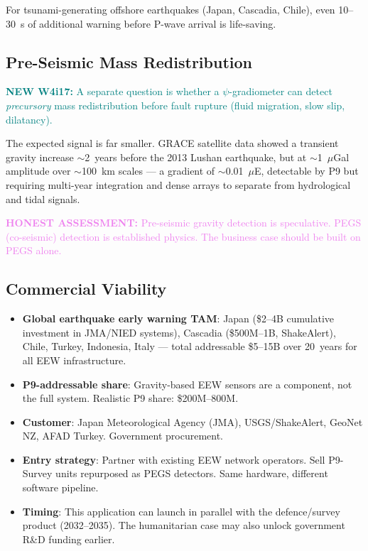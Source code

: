 \documentclass[11pt]{article}
\theoremstyle{definition}
\theoremstyle{remark}
\newcommand{\honest}[1]{\textcolor{violet}{\textbf{HONEST ASSESSMENT:} #1}}
\newcommand{\newfinding}[1]{\textcolor{teal}{\textbf{NEW W4i17:} #1}}
\begin{document}
For tsunami-generating offshore earthquakes (Japan, Cascadia, Chile),
even 10--30~s of additional warning before P-wave arrival is
life-saving.

\subsection{Pre-Seismic Mass Redistribution}

\newfinding{A separate question is whether a $\psi$-gradiometer can
detect \emph{precursory} mass redistribution before fault rupture
(fluid migration, slow slip, dilatancy).}

The expected signal is far smaller. GRACE satellite data
showed a transient gravity increase $\sim$2~years before the 2013
Lushan earthquake, but at $\sim$1~$\mu$Gal amplitude over
$\sim$100~km scales --- a gradient of $\sim$0.01~$\mu$E, detectable
by P9 but requiring multi-year integration and dense arrays to
separate from hydrological and tidal signals.

\honest{Pre-seismic gravity detection is speculative. PEGS
(co-seismic) detection is established physics. The business case
should be built on PEGS alone.}

\subsection{Commercial Viability}

\begin{itemize}
  \item \textbf{Global earthquake early warning TAM}: Japan (\$2--4B
    cumulative investment in JMA/NIED systems), Cascadia (\$500M--1B,
    ShakeAlert), Chile, Turkey, Indonesia, Italy --- total addressable
    \$5--15B over 20~years for all EEW infrastructure.
  \item \textbf{P9-addressable share}: Gravity-based EEW sensors are
    a component, not the full system. Realistic P9 share: \$200M--800M.
  \item \textbf{Customer}: Japan Meteorological Agency (JMA),
    USGS/ShakeAlert, GeoNet NZ, AFAD Turkey. Government procurement.
  \item \textbf{Entry strategy}: Partner with existing EEW network
    operators. Sell P9-Survey units repurposed as PEGS detectors.
    Same hardware, different software pipeline.
  \item \textbf{Timing}: This application can launch in parallel with
    the defence/survey product (2032--2035). The humanitarian case
    may also unlock government R\&D funding earlier.
\end{itemize}
\end{document}
